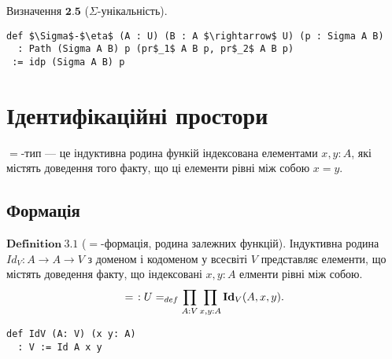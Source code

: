 \documentclass{article}
\theoremstyle{definition}
\begin{document}
$\textbf{Визначення\ 2.5}$ ($\Sigma$-унікальність).
\begin{lstlisting}[mathescape=true]
def $\Sigma$-$\eta$ (A : U) (B : A $\rightarrow$ U) (p : Sigma A B)
  : Path (Sigma A B) p (pr$_1$ A B p, pr$_2$ A B p)
 := idp (Sigma A B) p
\end{lstlisting}

\newpage
\section{Ідентифікаційні простори}

$=$-тип --- це індуктивна родина функій індексована елементами $x,y : A$,
які містять доведення того факту, що ці елементи рівні між собою $x=y$.

\subsection{Формація}
$\mathbf{Definition\ 3.1}$ ($=$-формація, родина залежних функцій). Індуктивна родина
$Id_V: A \rightarrow A \rightarrow V$ з доменом і кодоменом у всесвіті $V$
представляє елементи, що містять доведення факту, що індексовані $x,y:A$
елменти рівні між собою.
$$
  =\hspace{0.4em} : U =_{def} \prod_{A:V}\prod_{x,y:A} \mathbf{Id}_V(A,x,y).
$$
\begin{lstlisting}[mathescape=true]
def IdV (A: V) (x y: A)
  : V := Id A x y
\end{lstlisting}
\end{document}
